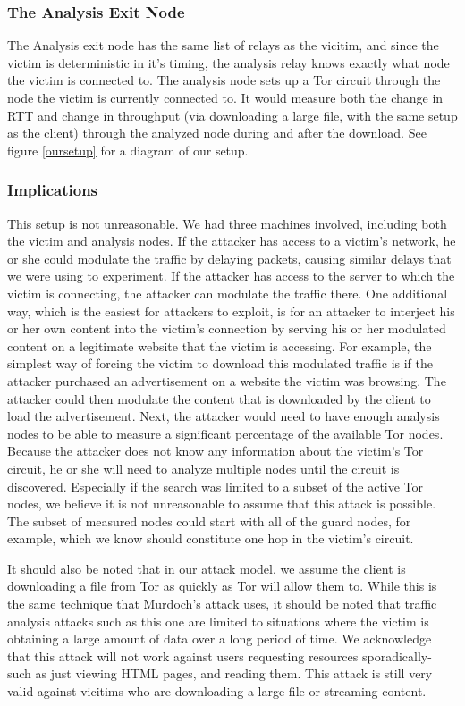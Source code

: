 \documentclass[12pt,journal]{IEEEtran}
\begin{document}
\subsubsection{The Analysis Exit Node} The Analysis exit node has the same list of relays as the vicitim, and since the victim is deterministic in it's timing, the analysis relay knows exactly what node the victim is connected to. The analysis node sets up a Tor circuit through the node the victim is currently connected to. It would measure both the change in RTT and change in throughput (via downloading a large file, with the same setup as the client) through the analyzed node during and after the download. See figure \ref{oursetup} for a diagram of our setup.

\subsubsection{Implications}
This setup is not unreasonable. We had three machines involved, including both the victim and analysis nodes. If the attacker has access to a victim's network, he or she could modulate the traffic by delaying packets, causing similar delays that we were using to experiment. If the attacker has access to the server to which the victim is connecting, the attacker can modulate the traffic there.
One additional way, which is the easiest for attackers to exploit, is for an attacker to interject his or her own content into the victim's connection by serving his or her modulated content on a legitimate website that the victim is accessing. For example, the simplest way of forcing the victim to download this modulated traffic is if the attacker purchased an advertisement on a website the victim was browsing. The attacker could then modulate the content that is downloaded by the client to load the advertisement.
Next, the attacker would need to have enough analysis nodes to be able to measure a significant percentage of the available Tor nodes. Because the attacker does not know any information about the victim's Tor circuit, he or she will need to analyze multiple nodes until the circuit is discovered. Especially if the search was limited to a subset of the active Tor nodes, we believe it is not unreasonable to assume that this attack is possible. The subset of measured nodes could start with all of the guard nodes, for example, which we know should constitute one hop in the victim's circuit.

It should also be noted that in our attack model, we assume the client is downloading a file from Tor as quickly as Tor will allow them to. While this is the same technique that Murdoch's attack uses, it should be noted that traffic analysis attacks such as this one are limited to situations where the victim is obtaining a large amount of data over a long period of time. We acknowledge that this attack will not work against users requesting resources sporadically- such as just viewing HTML pages, and reading them. This attack is still very valid against vicitims who are downloading a large file or streaming content.
\end{document}
